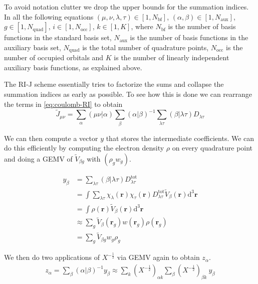 \documentclass{article}
\begin{document}
To avoid notation clutter we drop the upper bounds for
the summation indices. In all the following equations
\( (\mu,  \nu ,\lambda, \tau) \in [1,N_\text{bf}] \),
\( (\alpha,\beta) \in [1,N_\text{aux}] \),
\( g \in [1,N_{\text{quad}}] \),
\( i \in [1,N_{\text{occ}}] \),
\( k \in [1,K] \), where
\( N_\text{bf} \) is the number of basis functions in the
standard basis set,
\( N_\text{aux} \) is the number of basis functions in the
auxiliary basis set,
\( N_\text{quad} \) is the total number of quadrature points,
\( N_\text{occ} \) is the number of occupied orbitals and
\( K \) is the number of linearly independent auxiliary basis
functions, as explained above.

The RI-J scheme essentially tries to factorize the sums and collapse
the summation indices as
early as possible. To see how this is done we can rearrange the terms
in \eqref{eq:coulomb-RI} to obtain
\begin{equation}
  \tilde J_{\mu  \nu } = \sum_{\alpha}
  (\mu \nu | \alpha)\sum_{\beta}(\alpha |
  \beta)^{-1} \sum_{\lambda
  \tau}(\beta|\lambda\tau)D_{\lambda\tau}
  \label{eq:coulomb_rearranged}
\end{equation}

We can then compute a vector \( y \) that stores the
intermediate coefficients. We can do this efficiently by computing
the electron density \( \rho
\) on every quadrature point and doing a GEMV of \( \tilde V_{\beta
g} \) with \( (\rho_g w_g ) \).

\begin{align}
  y_\beta
  &= \sum_{\lambda
  \tau}(\beta|\lambda\tau)D^{\text{tot}}_{\lambda\tau}\\
  &= \int \sum_{\lambda \tau}
  \chi_\lambda(\mathbf{r})\chi_\tau(\mathbf{r})
  D^{\text{tot}}_{\lambda\tau} \tilde V_\beta(\mathbf{r})
  \mathrm d^3\mathbf{r}\\
  &= \int \rho(\mathbf r) \tilde V_\beta(\mathbf{r})
  \mathrm d^3\mathbf{r}\\
  &\approx   \sum_{g}\tilde{V}_\beta(\mathbf r_g) w
  (\mathbf r_g)\rho(\mathbf r_g) \\
  &= \sum_{g}\tilde{V}_{\beta g} w_g \rho_g
\end{align}

We then do two applications of \( X^{-\frac{1}{2}} \) via GEMV again
to obtain \( z_\alpha \).
\begin{align}
  z_\alpha
  = \sum_{\beta}(\alpha|\beta)^{-1}y_\beta
  \approx \sum_k (X^{-\frac{1}{2}})_{\alpha k} \sum_\beta
  (X^{-\frac{1}{2}})_{\beta k} \ y_\beta
\end{align}
\end{document}
